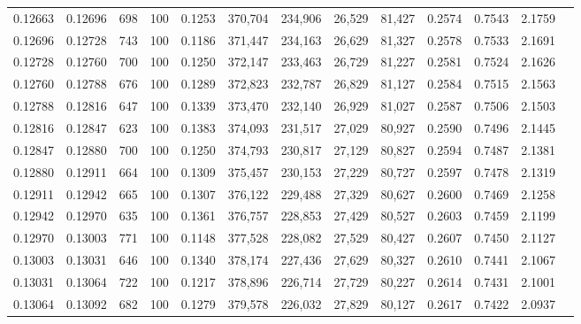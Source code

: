 \begin{tabular}{rrrrrrrrrrrrr}
0.12663 & 0.12696 &   698 & 100 &                                     0.1253 & 370,704 & 234,906 &  26,529 &  81,427 & 0.2574 & 0.7543 & 2.1759 \\
0.12696 & 0.12728 &   743 & 100 &                                     0.1186 & 371,447 & 234,163 &  26,629 &  81,327 & 0.2578 & 0.7533 & 2.1691 \\
0.12728 & 0.12760 &   700 & 100 &                                     0.1250 & 372,147 & 233,463 &  26,729 &  81,227 & 0.2581 & 0.7524 & 2.1626 \\
0.12760 & 0.12788 &   676 & 100 &                                     0.1289 & 372,823 & 232,787 &  26,829 &  81,127 & 0.2584 & 0.7515 & 2.1563 \\
0.12788 & 0.12816 &   647 & 100 &                                     0.1339 & 373,470 & 232,140 &  26,929 &  81,027 & 0.2587 & 0.7506 & 2.1503 \\
0.12816 & 0.12847 &   623 & 100 &                                     0.1383 & 374,093 & 231,517 &  27,029 &  80,927 & 0.2590 & 0.7496 & 2.1445 \\
0.12847 & 0.12880 &   700 & 100 &                                     0.1250 & 374,793 & 230,817 &  27,129 &  80,827 & 0.2594 & 0.7487 & 2.1381 \\
0.12880 & 0.12911 &   664 & 100 &                                     0.1309 & 375,457 & 230,153 &  27,229 &  80,727 & 0.2597 & 0.7478 & 2.1319 \\
0.12911 & 0.12942 &   665 & 100 &                                     0.1307 & 376,122 & 229,488 &  27,329 &  80,627 & 0.2600 & 0.7469 & 2.1258 \\
0.12942 & 0.12970 &   635 & 100 &                                     0.1361 & 376,757 & 228,853 &  27,429 &  80,527 & 0.2603 & 0.7459 & 2.1199 \\
0.12970 & 0.13003 &   771 & 100 &                                     0.1148 & 377,528 & 228,082 &  27,529 &  80,427 & 0.2607 & 0.7450 & 2.1127 \\
0.13003 & 0.13031 &   646 & 100 &                                     0.1340 & 378,174 & 227,436 &  27,629 &  80,327 & 0.2610 & 0.7441 & 2.1067 \\
0.13031 & 0.13064 &   722 & 100 &                                     0.1217 & 378,896 & 226,714 &  27,729 &  80,227 & 0.2614 & 0.7431 & 2.1001 \\
0.13064 & 0.13092 &   682 & 100 &                                     0.1279 & 379,578 & 226,032 &  27,829 &  80,127 & 0.2617 & 0.7422 & 2.0937 \\

\end{tabular}
